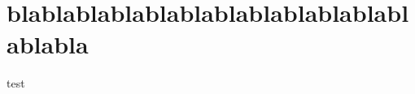 \documentclass{beamer}
\begin{document}
\section{blablablablablablablablablablablablablabla}

\begin{frame}
test
\end{frame} 
\end{document}
